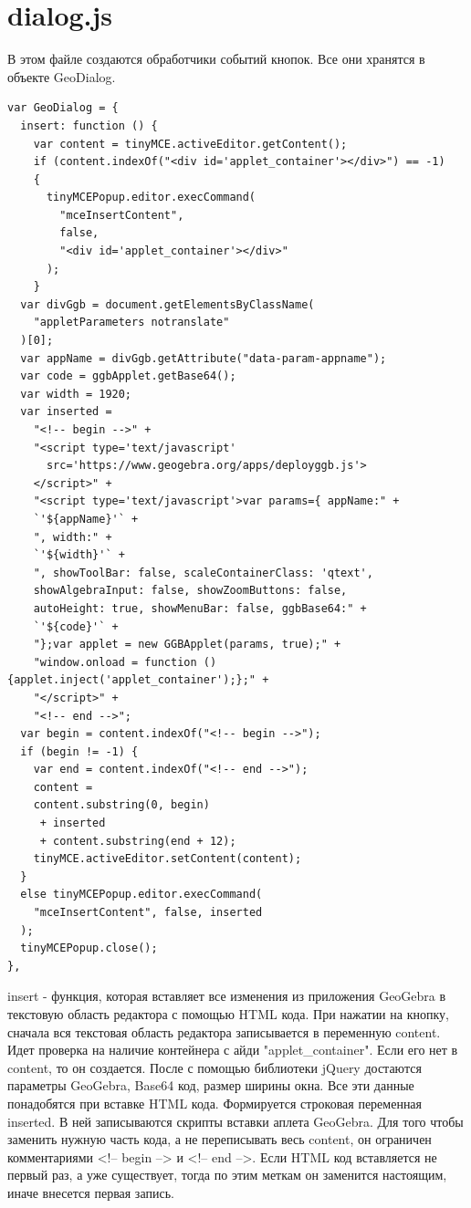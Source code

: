 \documentclass[14pt,Diplom]{diplomwork}
\begin{document}
\section{dialog.js}
В этом файле создаются обработчики событий кнопок. Все они хранятся в объекте GeoDialog.
\begin{verbatim}
var GeoDialog = {
  insert: function () {
    var content = tinyMCE.activeEditor.getContent();
    if (content.indexOf("<div id='applet_container'></div>") == -1) 
    {
      tinyMCEPopup.editor.execCommand(
        "mceInsertContent",
        false,
        "<div id='applet_container'></div>"
      );
    }
  var divGgb = document.getElementsByClassName(
    "appletParameters notranslate"
  )[0];
  var appName = divGgb.getAttribute("data-param-appname");
  var code = ggbApplet.getBase64();
  var width = 1920;
  var inserted =
    "<!-- begin -->" +
    "<script type='text/javascript' 
      src='https://www.geogebra.org/apps/deployggb.js'>
    </script>" +
    "<script type='text/javascript'>var params={ appName:" +
    `'${appName}'` +
    ", width:" +
    `'${width}'` +
    ", showToolBar: false, scaleContainerClass: 'qtext',
    showAlgebraInput: false, showZoomButtons: false, 
    autoHeight: true, showMenuBar: false, ggbBase64:" +
    `'${code}'` +
    "};var applet = new GGBApplet(params, true);" +
    "window.onload = function () {applet.inject('applet_container');};" +
    "</script>" +
    "<!-- end -->";
  var begin = content.indexOf("<!-- begin -->");
  if (begin != -1) {
    var end = content.indexOf("<!-- end -->");
    content =
    content.substring(0, begin)
     + inserted 
     + content.substring(end + 12);
    tinyMCE.activeEditor.setContent(content);
  } 
  else tinyMCEPopup.editor.execCommand(
    "mceInsertContent", false, inserted
  );
  tinyMCEPopup.close();
},
\end{verbatim}
insert - функция, которая вставляет все изменения из приложения GeoGebra в текстовую область редактора с помощью HTML кода. При нажатии на кнопку, сначала вся текстовая область редактора записывается в переменную content. Идет проверка на наличие контейнера с айди "applet\_container". Если его нет в content, то он создается. После с помощью библиотеки jQuery достаются параметры GeoGebra, Base64 код, размер ширины окна. Все эти данные понадобятся при вставке HTML кода. Формируется строковая переменная inserted. В ней записываются скрипты вставки аплета GeoGebra. Для того чтобы заменить нужную часть кода, а не переписывать весь content, он ограничен комментариями <!-- begin --> и <!-- end -->. Если HTML код вставляется не первый раз, а уже существует, тогда по этим меткам он заменится настоящим, иначе внесется первая запись.
\end{document}
